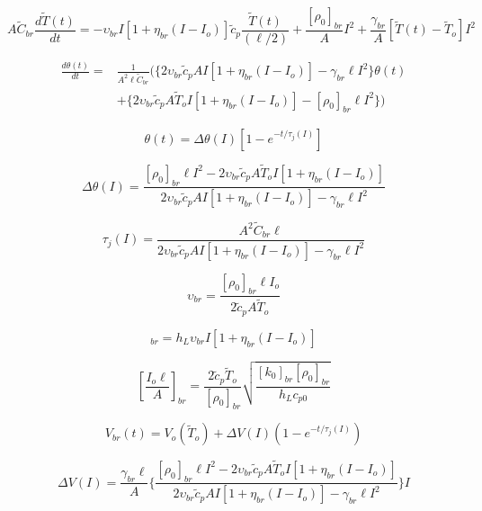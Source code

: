 \begin{equation}%
A\tilde{C}_{br}\frac{d\tilde{T}(t)}{dt}=-\upsilon_{br}I[1+\eta_{br}(I-I_o)]\tilde{c}_p\frac{\tilde{T}(t)}{(\ell/2)}+\frac{[\rho_0]_{br}}{A}I^2+\frac{\gamma_{br}}{A}[\tilde{T}(t)-\tilde{T}_o]I^2
\end{equation}

\begin{align}%
\frac{d\theta(t)}{dt}=&\frac{1}{A^2\ell\tilde{C}_{br}}(\{2\upsilon_{br}\tilde{c}_pAI[1+\eta_{br}(I-I_o)]-\gamma_{br}\ell I^2\}\theta(t) \\
&+\{2\upsilon_{br}\tilde{c}_pA\tilde{T}_oI[1+\eta_{br}(I-I_o)]-[\rho_0]_{br}\ell I^2\})
\end{align}

\begin{equation}%
\theta(t)=\Delta\theta(I)\left[1-e^{-t/\tau_j(I)}\right]
\end{equation}

\begin{equation}%
\Delta\theta(I)=\frac{[\rho_0]_{br}\ell I^2-2\upsilon_{br}\tilde{c}_pA\tilde{T}_oI[1+\eta_{br}(I-I_o)]}{2\upsilon_{br}\tilde{c}_pAI[1+\eta_{br}(I-I_o)]-\gamma_{br}\ell I^2}
\end{equation}

\begin{equation}%
\tau_j(I)=\frac{A^2\tilde{C}_{br}\ell}{2\upsilon_{br}\tilde{c}_pAI[1+\eta_{br}(I-I_o)]-\gamma_{br}\ell I^2}
\end{equation}

\begin{equation}%
\upsilon_{br}=\frac{[\rho_0]_{br}\ell I_o}{2\tilde{c}_pA\tilde{T}_o}
\end{equation}

\begin{equation}%
[Q_I]_{br}=h_L\upsilon_{br}I[1+\eta_{br}(I-I_o)]
\end{equation}

\begin{equation}%
\left[\frac{I_o\ell}{A}\right]_{br}=\frac{2\tilde{c}_p\tilde{T}_o}{[\rho_0]_{br}}\sqrt{\frac{[k_0]_{br}[\rho_0]_{br}}{h_Lc_{p0}}}
\end{equation}

\begin{equation}%
V_{br}(t)=V_o(\tilde{T}_o)+\Delta V(I)(1-e^{-t/\tau_j(I)})
\end{equation}

\begin{equation}%
\Delta V(I)=\frac{\gamma_{br}\ell}{A}\{\frac{[\rho_0]_{br}\ell I^2-2\upsilon_{br}\tilde{c}_pA\tilde{T}_oI[1+\eta_{br}(I-I_o)]}{2\upsilon_{br}\tilde{c}_pAI[1+\eta_{br}(I-I_o)]-\gamma_{br}\ell I^2}\}I
\end{equation}

